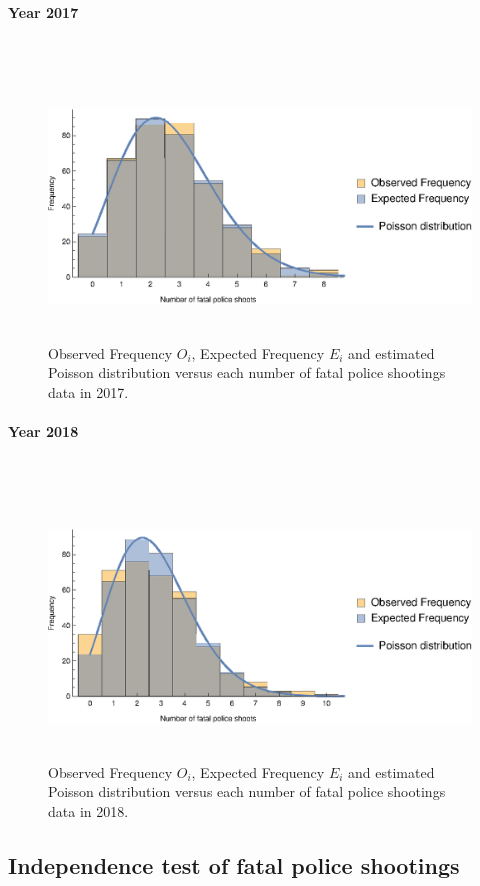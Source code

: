 \documentclass[conf]{new-aiaa}
\begin{document}
\paragraph{Year 2017}\ 

\begin{figure}[!htbp]
\centering
\includegraphics[height=7cm]{q3/q3-2017-exp.eps}
\caption{Observed Frequency $O_i$, Expected Frequency $E_i$ and estimated Poisson distribution versus each number of fatal police shootings data in 2017.}
\label{fig:q3-2017-exp}
\end{figure}

\paragraph{Year 2018}\ 

\begin{figure}[!htbp]
\centering
\includegraphics[height=7cm]{q3/q3-2018-exp.eps}
\caption{Observed Frequency $O_i$, Expected Frequency $E_i$ and estimated Poisson distribution versus each number of fatal police shootings data in 2018.}
\label{fig:q3-2018-exp}
\end{figure}

\subsection{Independence test of fatal police shootings}
\end{document}
